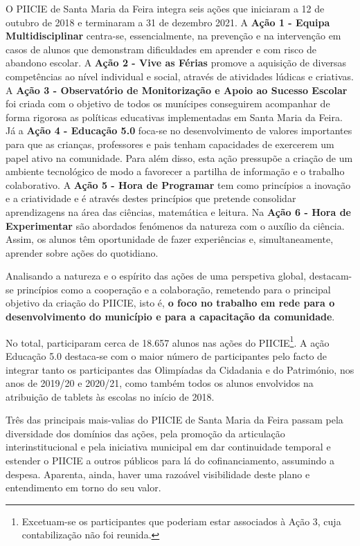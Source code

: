 \documentclass[
]{book}
\begin{document}
O PIICIE de Santa Maria da Feira integra seis ações que iniciaram a 12 de outubro de 2018 e terminaram a 31 de dezembro 2021. A \textbf{Ação 1 - Equipa Multidisciplinar} centra-se, essencialmente, na prevenção e na intervenção em casos de alunos que demonstram dificuldades em aprender e com risco de abandono escolar. A \textbf{Ação 2 - Vive as Férias} promove a aquisição de diversas competências ao nível individual e social, através de atividades lúdicas e criativas. A \textbf{Ação 3 - Observatório de Monitorização e Apoio ao Sucesso Escolar} foi criada com o objetivo de todos os munícipes conseguirem acompanhar de forma rigorosa as políticas educativas implementadas em Santa Maria da Feira. Já a \textbf{Ação 4 - Educação 5.0} foca-se no desenvolvimento de valores importantes para que as crianças, professores e pais tenham capacidades de exercerem um papel ativo na comunidade. Para além disso, esta ação pressupõe a criação de um ambiente tecnológico de modo a favorecer a partilha de informação e o trabalho colaborativo. A \textbf{Ação 5 - Hora de Programar} tem como princípios a inovação e a criatividade e é através destes princípios que pretende consolidar aprendizagens na área das ciências, matemática e leitura. Na \textbf{Ação 6 - Hora de Experimentar} são abordados fenómenos da natureza com o auxílio da ciência. Assim, os alunos têm oportunidade de fazer experiências e, simultaneamente, aprender sobre ações do quotidiano.

Analisando a natureza e o espírito das ações de uma perspetiva global, destacam-se princípios como a cooperação e a colaboração, remetendo para o principal objetivo da criação do PIICIE, isto é, \textbf{o foco no trabalho em rede para o desenvolvimento do município e para a capacitação da comunidade}.

No total, participaram cerca de 18.657 alunos nas ações do PIICIE\footnote{Excetuam-se os participantes que poderiam estar associados à Ação 3, cuja contabilização não foi reunida.}. A ação Educação 5.0 destaca-se com o maior número de participantes pelo facto de integrar tanto os participantes das Olimpíadas da Cidadania e do Património, nos anos de 2019/20 e 2020/21, como também todos os alunos envolvidos na atribuição de tablets às escolas no início de 2018.

Três das principais mais-valias do PIICIE de Santa Maria da Feira passam pela diversidade dos domínios das ações, pela promoção da articulação interinstitucional e pela iniciativa municipal em dar continuidade temporal e estender o PIICIE a outros públicos para lá do cofinanciamento, assumindo a despesa. Aparenta, ainda, haver uma razoável visibilidade deste plano e entendimento em torno do seu valor.
\end{document}
